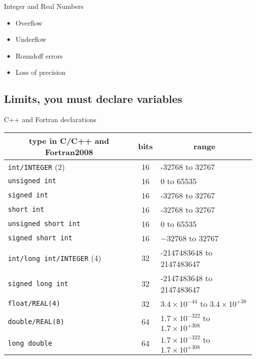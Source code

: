 \documentclass[%
oneside,                 %
final,                   %
10pt]{article}
\begin{document}
\begin{block}{Integer and Real Numbers }

\begin{itemize}
  \item Overflow

  \item Underflow

  \item Roundoff errors

  \item Loss of precision
\end{itemize}

\noindent
\end{block}

\subsection{Limits, you must declare variables}


\begin{block}{C++ and Fortran declarations }


{\footnotesize
\begin{tabular}{lcl}
\hline
\multicolumn{1}{c}{ type in C/C++ and Fortran2008 } & \multicolumn{1}{c}{ bits } & \multicolumn{1}{c}{ range } \\
\hline
\Verb!int/INTEGER! (2)          & 16   & -32768 to 32767                                \\
\Verb!unsigned int!             & 16   & 0 to 65535                                     \\
\Verb!signed int!               & 16   & -32768 to 32767                                \\
\Verb!short int!                & 16   & -32768 to 32767                                \\
\Verb!unsigned short int!       & 16   & 0 to 65535                                     \\
\Verb!signed short int!         & 16   & $-32768$ to 32767                              \\
\Verb!int/long int/INTEGER! (4) & 32   & -2147483648 to 2147483647                      \\
\Verb!signed long int!          & 32   & -2147483648 to 2147483647                      \\
\Verb!float/REAL(4)!            & 32   & $3.4\times 10^{-44}$ to $3.4\times 10^{+38}$   \\
\Verb!double/REAL(8)!           & 64   & $1.7\times 10^{-322}$ to $1.7\times 10^{+308}$ \\
\Verb!long double!              & 64   & $1.7\times 10^{-322}$ to $1.7\times 10^{+308}$ \\
\hline
\end{tabular}
}

\noindent
\end{block}
\end{document}

